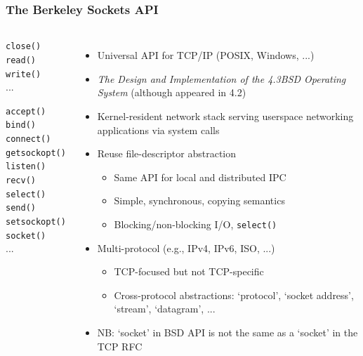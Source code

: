\begin{frame}
  \frametitle{The Berkeley Sockets API}

  \begin{columns}[T]
      \bigskip
      \begin{scriptsize}
	\texttt{close()} \\
	\texttt{read()} \\
	\texttt{write()} \\
	...

	\bigskip

	\texttt{accept()} \\
	\texttt{bind()} \\
	\texttt{connect()} \\
	\texttt{getsockopt()} \\
	\texttt{listen()} \\
	\texttt{recv()} \\
	\texttt{select()} \\
	\texttt{send()} \\
	\texttt{setsockopt()} \\
	\texttt{socket()} \\
	...
      \end{scriptsize}

    \begin{itemize}
      \item Universal API for TCP/IP (POSIX, Windows, ...)
      \item \textit{The Design and Implementation of the 4.3BSD Operating
	System} (although appeared in 4.2)
      \item Kernel-resident network stack serving userspace networking
	applications via system calls

      \pause

      \item Reuse file-descriptor abstraction
      \begin{itemize}
	\item Same API for local and distributed IPC
	\item Simple, synchronous, copying semantics
	\item Blocking/non-blocking I/O, \texttt{select()}
      \end{itemize}

      \pause

      \item Multi-protocol (e.g., IPv4, IPv6, ISO, ...)
      \begin{itemize}
	\item TCP-focused but not TCP-specific
	\item Cross-protocol abstractions: `protocol', `socket
	  address', `stream', `datagram', ...
      \end{itemize}
      \item NB: `socket' in BSD API is not the same as a `socket' in the TCP
	RFC
    \end{itemize}
  \end{columns}
\end{frame}

